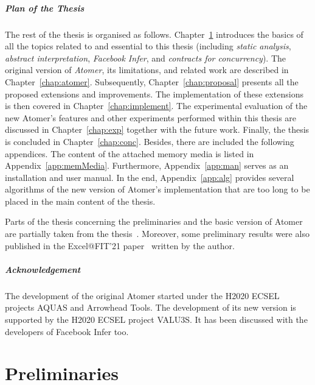 \paragraph{Plan of the Thesis}
The rest of the thesis is organised as follows. Chapter~\ref{chap:prelim} introduces the basics of all the topics related to and essential to this thesis (including \emph{static analysis}, \emph{abstract interpretation}, \emph{Facebook Infer}, and \emph{contracts for concurrency}). The original version of \emph{Atomer}, its limitations, and related work are described in Chapter~\ref{chap:atomer}. Subsequently, Chapter~\ref{chap:proposal} presents all the proposed extensions and improvements. The implementation of these extensions is then covered in Chapter~\ref{chap:implement}. The experimental evaluation of the new Atomer's features and other experiments performed within this thesis are discussed in Chapter~\ref{chap:exp} together with the future work. Finally, the thesis is concluded in Chapter~\ref{chap:conc}. Besides, there are included the following appendices. The content of the attached memory media is listed in Appendix~\ref{app:memMedia}. Furthermore, Appendix~\ref{app:man} serves as an installation and user manual. In the end, Appendix~\ref{app:alg} provides several algorithms of the new version of Atomer's implementation that are too long to be placed in the main content of the thesis.

Parts of the thesis concerning the preliminaries and the basic version of Atomer are partially taken from the thesis~\cite{harmimBP}. Moreover, some preliminary results were also published in the Excel@FIT'21 paper~\cite{excel2021Harmim} written by the author.

\paragraph{Acknowledgement}
The development of the original Atomer started under the H2020 ECSEL projects AQUAS and Arrowhead Tools. The development of its new version is supported by the H2020 ECSEL project VALU3S. It has been discussed with the developers of Facebook Infer too.






\chapter{Preliminaries}
\label{chap:prelim}

